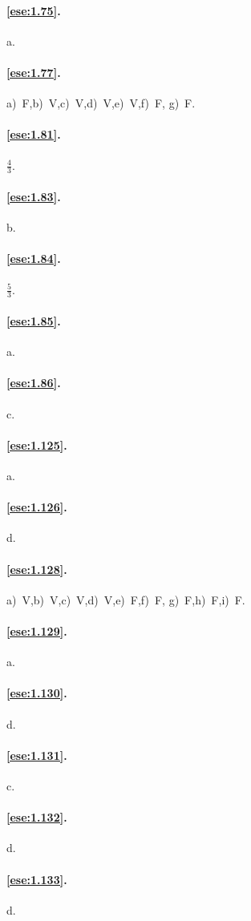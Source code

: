 \paragraph{\ref{ese:1.75}.}
a.

\paragraph{\ref{ese:1.77}.}
a)~F,\quad b)~V,\quad c)~V,\quad d)~V,\quad e)~V,\quad f)~F,\quad 
g)~F.

\paragraph{\ref{ese:1.81}.}
\(\frac{4}{3}\).

\paragraph{\ref{ese:1.83}.}
b.

\paragraph{\ref{ese:1.84}.}
\(\frac{5}{3}\).

\paragraph{\ref{ese:1.85}.}
a.

\paragraph{\ref{ese:1.86}.}
c.


\paragraph{\ref{ese:1.125}.}
a.

\paragraph{\ref{ese:1.126}.}
d.

\paragraph{\ref{ese:1.128}.}
a)~V,\quad b)~V,\quad c)~V,\quad d)~V,\quad e)~F,\quad f)~F,\quad 
g)~F,\quad h)~F,\quad i)~F.

\paragraph{\ref{ese:1.129}.}
a.

\paragraph{\ref{ese:1.130}.}
d.

\paragraph{\ref{ese:1.131}.}
c.

\paragraph{\ref{ese:1.132}.}
d.

\paragraph{\ref{ese:1.133}.}
d.

\endgroup
